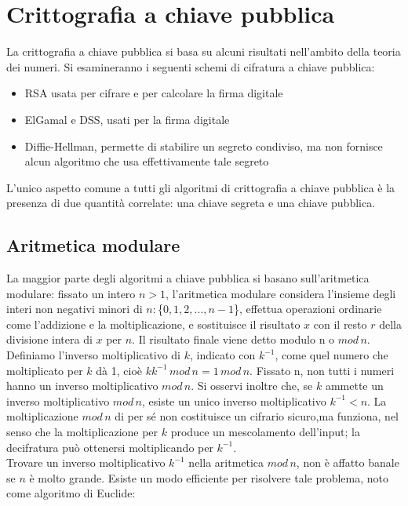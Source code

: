 \chapter{Crittografia a chiave pubblica}
La crittografia a chiave pubblica si basa su alcuni risultati nell'ambito della teoria dei numeri. Si esamineranno i seguenti schemi di cifratura a chiave pubblica: 
\begin{itemize}
\item RSA usata per cifrare e per calcolare la firma digitale
\item ElGamal e DSS, usati per la firma digitale
\item Diffie-Hellman, permette di stabilire un segreto condiviso, ma non fornisce alcun algoritmo che usa effettivamente tale segreto
\end{itemize}

L'unico aspetto comune a tutti gli algoritmi di crittografia a chiave pubblica è la presenza di due quantità correlate: una chiave segreta e una chiave pubblica.
\section{Aritmetica modulare}
La maggior parte degli algoritmi a chiave pubblica si basano sull'aritmetica modulare: fissato un intero $ n>1 $, l'aritmetica modulare considera l'insieme degli interi non negativi minori di
$n: $\{$0, 1, 2,..., n-1$\}, effettua operazioni ordinarie come l'addizione e la moltiplicazione, e sostituisce il risultato $x$ con il resto $r$ della divisione intera di $x$ per $n$. Il risultato finale viene detto modulo n o $mod \, n$. \\
Definiamo l'inverso moltiplicativo di $k$, indicato con $k^{-1}$, come quel numero che moltiplicato per $k$ dà 1, cioè $kk^{-1} \, mod \, n = 1 \, mod \, n$. Fissato n, non tutti i numeri hanno un inverso moltiplicativo $mod \, n$. Si osservi inoltre che, se $k$ ammette un inverso moltiplicativo $mod \, n $, esiste un unico inverso moltiplicativo $k^{-1} < n$. La moltiplicazione $mod \, n$ di per sé non costituisce un cifrario sicuro,ma funziona, nel senso che la moltiplicazione per $k$ produce un mescolamento dell'input; la decifratura può ottenersi moltiplicando per $k^{-1}$.\\ Trovare un inverso moltiplicativo $k^{-1}$ nella aritmetica $mod \, n$, non è affatto banale se $n$ è molto grande. Esiste un modo efficiente per risolvere tale problema, noto come algoritmo di Euclide: 

